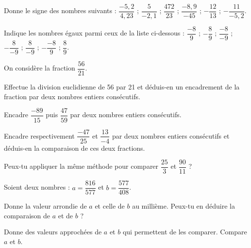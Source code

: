 
\begin{exercice}[Signes]

Donne le signe des nombres suivants :
$\dfrac{-5,2}{4,23}$ ; $\dfrac{5}{-2,1}$ ; $\dfrac{472}{23}$ ; $\dfrac{-8,9}{-45}$ ; $-\dfrac{12}{13}$ ; $-\dfrac{11}{-5,2}$.
\end{exercice}

\begin{exercice}

Indique les nombres égaux parmi ceux de la liste ci-dessous :
$\dfrac{-8}{9}$ ; $-\dfrac{8}{9}$ ; $\dfrac{-8}{-9}$ ; $-\dfrac{8}{-9}$ ; $\dfrac{8}{-9}$ ; $-\dfrac{-8}{9}$ ; $\dfrac{8}{9}$.
\end{exercice}

\begin{exercice}[Encadrement]

\begin{colenumerate}{1} 
\item On considère la fraction $\dfrac{56}{21}$.

Effectue la division euclidienne de 56 par 21 et déduis-en un encadrement de la fraction par deux nombres entiers consécutifs.
\item Encadre $\dfrac{-89}{15}$ puis $\dfrac{47}{59}$ par deux nombres entiers consécutifs.
\item Encadre respectivement $\dfrac{-47}{25}$ et $\dfrac{13}{-4}$ par deux nombres entiers consécutifs et déduis-en la comparaison de ces deux fractions.
\item Peux-tu appliquer la même méthode pour comparer $\dfrac{25}{3}$ et $\dfrac{90}{11}$ ?
\end{colenumerate} 
 
\end{exercice}

\begin{exercice}
Soient deux nombres : $a = \dfrac{816}{577}$ et $b = \dfrac{577}{408}$.

\begin{colenumerate}{1} 
\item Donne la valeur arrondie de $a$ et celle de $b$ au millième. Peux-tu en déduire la comparaison de $a$ et de $b$ ?
\item Donne des valeurs approchées de $a$ et $b$ qui permettent de les comparer. Compare $a$ et $b$.
\end{colenumerate} 
 
\end{exercice}

